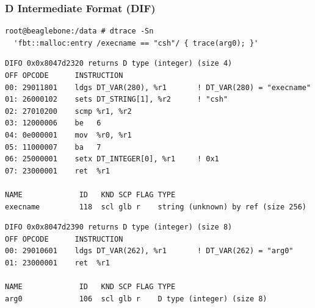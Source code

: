 \begin{frame}[fragile]
  \frametitle{D Intermediate Format (DIF)}

  \begin{small}
\begin{verbatim}
root@beaglebone:/data # dtrace -Sn
  'fbt::malloc:entry /execname == "csh"/ { trace(arg0); }'
\end{verbatim}
  \end{small}

  \pause

  \begin{tiny}
\begin{verbatim}
DIFO 0x0x8047d2320 returns D type (integer) (size 4)
OFF OPCODE      INSTRUCTION
00: 29011801    ldgs DT_VAR(280), %r1		! DT_VAR(280) = "execname"
01: 26000102    sets DT_STRING[1], %r2		! "csh"
02: 27010200    scmp %r1, %r2
03: 12000006    be   6
04: 0e000001    mov  %r0, %r1
05: 11000007    ba   7
06: 25000001    setx DT_INTEGER[0], %r1		! 0x1
07: 23000001    ret  %r1

NAME             ID   KND SCP FLAG TYPE
execname         118  scl glb r    string (unknown) by ref (size 256)
\end{verbatim}
  \end{tiny}

\pause

  \begin{tiny}
\begin{verbatim}
DIFO 0x0x8047d2390 returns D type (integer) (size 8)
OFF OPCODE      INSTRUCTION
00: 29010601    ldgs DT_VAR(262), %r1		! DT_VAR(262) = "arg0"
01: 23000001    ret  %r1

NAME             ID   KND SCP FLAG TYPE
arg0             106  scl glb r    D type (integer) (size 8)
\end{verbatim}
  \end{tiny}
\end{frame}

